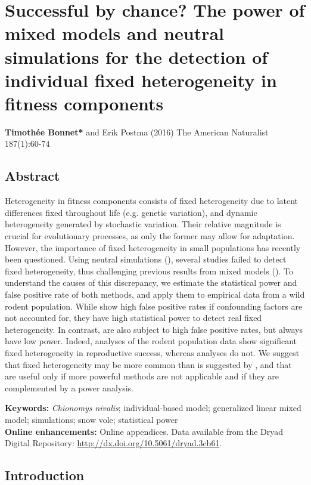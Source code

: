\chapter[Successful by chance?]{Successful by chance? The power of mixed models and neutral simulations for the detection of individual fixed heterogeneity in fitness components}

\textbf{Timoth\'{e}e Bonnet*} and Erik Postma (2016) The American Naturalist 187(1):60-74\\

\section{Abstract}
Heterogeneity in fitness components consists of fixed heterogeneity due to latent differences fixed throughout life (e.g. genetic variation), and dynamic heterogeneity generated by stochastic variation. Their relative magnitude is crucial for evolutionary processes, as only the former may allow for adaptation. 
However, the importance of fixed heterogeneity in small populations has recently been questioned. Using neutral simulations (\NSM), several studies failed to detect fixed heterogeneity, thus challenging previous results from mixed models (\MM).
To understand the causes of this discrepancy, we estimate the statistical power and false positive rate of both methods, and apply them to empirical data from a wild rodent population.
    While \MM show high false positive rates if confounding factors are not accounted for, they have high statistical power to detect real fixed heterogeneity. In contrast, \NSM are also subject to high false positive rates, but always have low power. Indeed, \MM analyses of the rodent population data show significant fixed heterogeneity in reproductive success, whereas \NSM analyses do not.
   We suggest that fixed heterogeneity may be more common than is suggested by \NSM, and that \NSM are useful only if more powerful methods are not applicable and if they are complemented by a power analysis.

\textbf{Keywords: } \textit{Chionomys nivalis}; individual-based model; generalized linear mixed model; simulations; snow vole; statistical power\\
\textbf{Online enhancements: }
Online appendices. Data available from the Dryad Digital Repository: \url{http://dx.doi.org/10.5061/dryad.3cb61}.

\section{Introduction}

